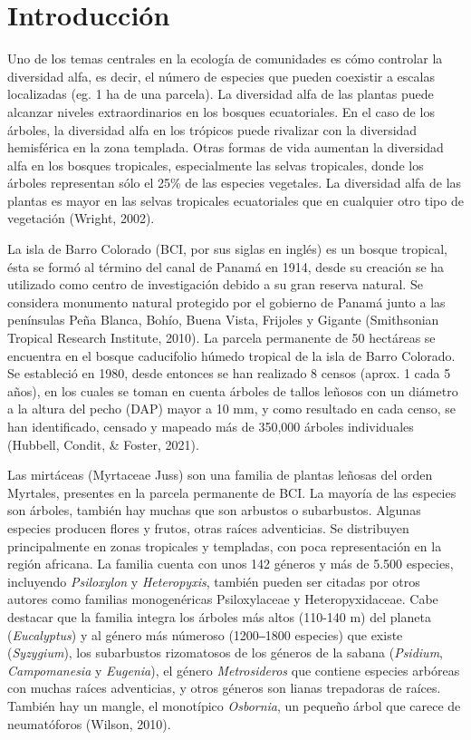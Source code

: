\documentclass[11pt,]{article}
\begin{document}
\vskip 6.5pt


\noindent  \section{Introducción}\label{introducciuxf3n}

Uno de los temas centrales en la ecología de comunidades es cómo
controlar la diversidad alfa, es decir, el número de especies que pueden
coexistir a escalas localizadas (eg. 1 ha de una parcela). La diversidad
alfa de las plantas puede alcanzar niveles extraordinarios en los
bosques ecuatoriales. En el caso de los árboles, la diversidad alfa en
los trópicos puede rivalizar con la diversidad hemisférica en la zona
templada. Otras formas de vida aumentan la diversidad alfa en los
bosques tropicales, especialmente las selvas tropicales, donde los
árboles representan sólo el 25\% de las especies vegetales. La
diversidad alfa de las plantas es mayor en las selvas tropicales
ecuatoriales que en cualquier otro tipo de vegetación (Wright, 2002).

La isla de Barro Colorado (BCI, por sus siglas en inglés) es un bosque
tropical, ésta se formó al término del canal de Panamá en 1914, desde su
creación se ha utilizado como centro de investigación debido a su gran
reserva natural. Se considera monumento natural protegido por el
gobierno de Panamá junto a las penínsulas Peña Blanca, Bohío, Buena
Vista, Frijoles y Gigante (Smithsonian Tropical Research Institute,
2010). La parcela permanente de 50 hectáreas se encuentra en el bosque
caducifolio húmedo tropical de la isla de Barro Colorado. Se estableció
en 1980, desde entonces se han realizado 8 censos (aprox. 1 cada 5
años), en los cuales se toman en cuenta árboles de tallos leñosos con un
diámetro a la altura del pecho (DAP) mayor a 10 mm, y como resultado en
cada censo, se han identificado, censado y mapeado más de 350,000
árboles individuales (Hubbell, Condit, \& Foster, 2021).

Las mirtáceas (Myrtaceae Juss) son una familia de plantas leñosas del
orden Myrtales, presentes en la parcela permanente de BCI. La mayoría de
las especies son árboles, también hay muchas que son arbustos o
subarbustos. Algunas especies producen flores y frutos, otras raíces
adventicias. Se distribuyen principalmente en zonas tropicales y
templadas, con poca representación en la región africana. La familia
cuenta con unos 142 géneros y más de 5.500 especies, incluyendo
\emph{Psiloxylon} y \emph{Heteropyxis}, también pueden ser citadas por
otros autores como familias monogenéricas Psiloxylaceae y
Heteropyxidaceae. Cabe destacar que la familia integra los árboles más
altos (110-140 m) del planeta (\emph{Eucalyptus}) y al género más
númeroso (1200‒1800 especies) que existe (\emph{Syzygium}), los
subarbustos rizomatosos de los géneros de la sabana (\emph{Psidium},
\emph{Campomanesia} y \emph{Eugenia}), el género \emph{Metrosideros} que
contiene especies arbóreas con muchas raíces adventicias, y otros
géneros son lianas trepadoras de raíces. También hay un mangle, el
monotípico \emph{Osbornia}, un pequeño árbol que carece de neumatóforos
(Wilson, 2010).
\end{document}
